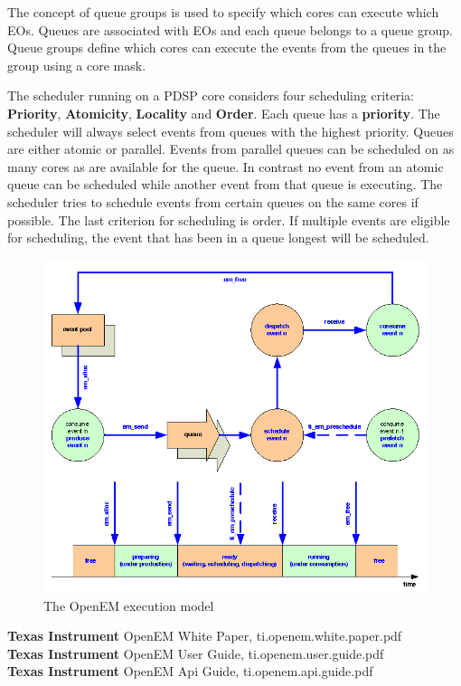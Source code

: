 The concept of queue groups is used to specify which cores can execute which EOs. Queues are associated with EOs and each queue belongs to a queue group. Queue groups define which cores can execute the events from the queues in the group using a core mask.

The scheduler running on a PDSP core considers four scheduling criteria: \textbf{Priority}, \textbf{Atomicity}, \textbf{Locality} and \textbf{Order}. Each queue has a \textbf{priority}. The scheduler will always select events from queues with the highest priority. Queues are either atomic or parallel. Events from parallel queues can be scheduled on as many cores as are available for the queue. In contrast no event from an atomic queue can be scheduled while another event from that queue is executing. The scheduler tries to schedule events from certain queues on the same cores if possible. The last criterion for scheduling is order. If multiple events are eligible for scheduling, the event that has been in a queue longest will be scheduled.

\begin{figure}[h!]
\begin{center}
\includegraphics[width=1.3\textwidth,natwidth=701,natheight=500]{openem_model.png}
\caption{The OpenEM execution model}\label{tiem}
\end{center}
\end{figure}

\textbf{Texas Instrument} OpenEM White Paper, ti.openem.white.paper.pdf\\
\textbf{Texas Instrument} OpenEM User Guide, ti.openem.user.guide.pdf\\
\textbf{Texas Instrument} OpenEM Api Guide, ti.openem.api.guide.pdf\\


